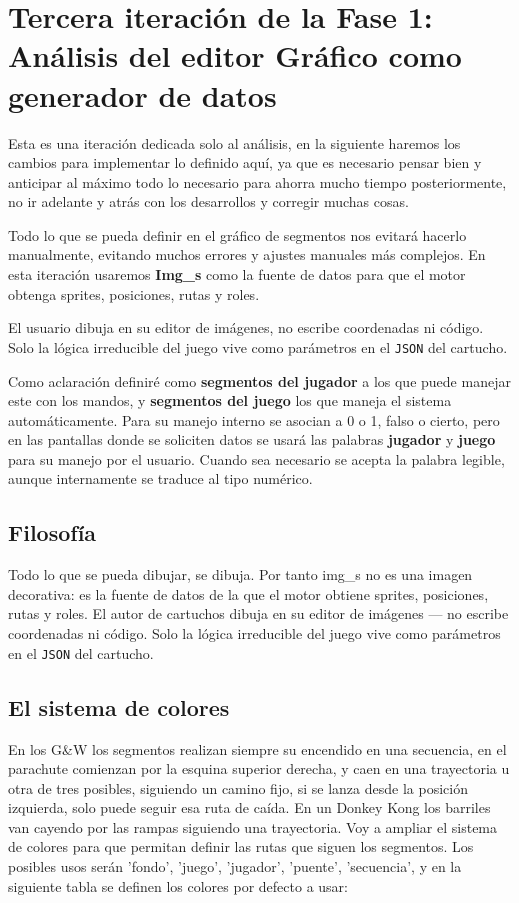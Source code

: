 \section{Tercera iteración de la Fase 1: Análisis del editor Gráfico como generador de datos}
\label{sec:GeneradorGraficoAnalisis}

Esta es una iteración dedicada solo al análisis, en la siguiente haremos los cambios para implementar lo definido aquí, ya que es necesario pensar bien y anticipar al máximo todo lo necesario para ahorra mucho tiempo posteriormente, no ir adelante y atrás con los desarrollos y corregir muchas cosas. 

Todo lo que se pueda definir en el gráfico de segmentos nos evitará hacerlo manualmente, evitando muchos errores y ajustes manuales más complejos. En esta iteración usaremos \textbf{Img\_s} como la fuente de datos para que el motor obtenga sprites, posiciones, rutas y roles. 

El usuario dibuja en su editor de imágenes, no escribe coordenadas ni código. Solo la lógica irreducible del juego vive como parámetros en el \texttt{JSON} del cartucho.

Como aclaración definiré como \textbf{segmentos del jugador} a los que puede manejar este con los mandos, y \textbf{segmentos del juego} los que maneja el sistema automáticamente. Para su manejo interno se asocian a 0 o 1, falso o cierto, pero en las pantallas donde se soliciten datos se usará las palabras \textbf{jugador} y \textbf{juego} para su manejo por el usuario. Cuando sea necesario se acepta la palabra legible, aunque internamente se traduce al tipo numérico.

\subsection{Filosofía}

Todo lo que se pueda dibujar, se dibuja. Por tanto img\_s no es una imagen decorativa: es la fuente de datos de la que el motor obtiene sprites, posiciones, rutas y roles. El autor de cartuchos dibuja en su editor de imágenes — no escribe coordenadas ni código. Solo la lógica irreducible del juego vive como parámetros en el \texttt{JSON} del cartucho.

\subsection{El sistema de colores}

En los G\&W los segmentos realizan siempre su encendido en una secuencia, en el parachute comienzan por la esquina superior derecha, y caen en una trayectoria u otra de tres posibles, siguiendo un camino fijo, si se lanza desde la posición izquierda, solo puede seguir esa ruta de caída. En un Donkey Kong los barriles van cayendo por las rampas siguiendo una trayectoria. Voy a ampliar el sistema de colores para que permitan definir las rutas que siguen los segmentos. Los posibles usos serán 'fondo', 'juego', 'jugador', 'puente', 'secuencia', y en la siguiente tabla se definen los colores por defecto a usar:

